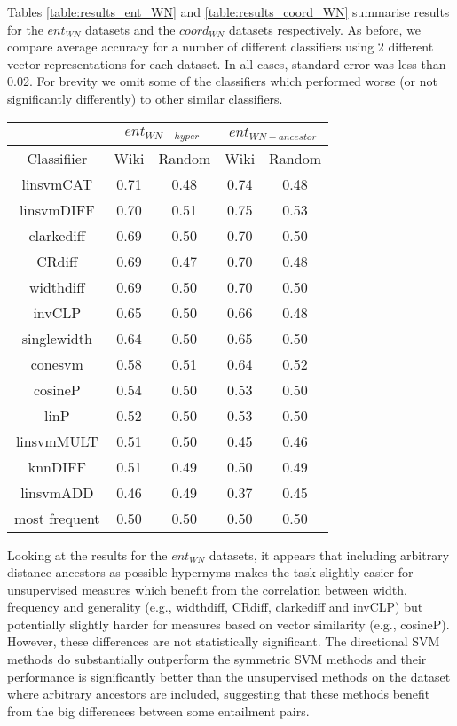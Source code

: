 \documentclass[11pt]{article}
\begin{document}
Tables \ref{table:results_ent_WN} and \ref{table:results_coord_WN} summarise results for the $ent_{WN}$ datasets and the $coord_{WN}$ datasets respectively.  As before, we compare average accuracy for a number of different classifiers using 2 different vector representations for each dataset.  In all cases, standard error was less than 0.02.  For brevity we omit some of the classifiers which performed worse (or not significantly differently) to other similar classifiers.


\begin{table*}[ht]
\centering
\begin{tabular}{|c|c|c|c|c|}
\hline
&\multicolumn{2}{|c|}{$ent_{WN-hyper}$}&\multicolumn{2}{|c|}{$ent_{WN-ancestor}$}\\
\hline
Classifiier&Wiki&Random&Wiki&Random\\
\hline
linsvmCAT&0.71&0.48&0.74&0.48\\
linsvmDIFF&0.70&0.51&0.75&0.53\\
clarkediff&0.69&0.50&0.70&0.50\\
CRdiff&0.69&0.47&0.70&0.48\\
widthdiff&0.69&0.50&0.70&0.50\\
invCLP&0.65&0.50&0.66&0.48\\
singlewidth&0.64&0.50&0.65&0.50\\
conesvm&0.58&0.51&0.64&0.52\\
cosineP&0.54&0.50&0.53&0.50\\
linP&0.52&0.50&0.53&0.50\\
linsvmMULT&0.51&0.50&0.45&0.46\\
knnDIFF&0.51&0.49&0.50&0.49\\
linsvmADD&0.46&0.49&0.37&0.45\\
most frequent&0.50&0.50&0.50&0.50\\
\hline
\end{tabular}
\caption{Accuracy Figures for $ent_{WN-hyper}$ and $ent_{WN-ancestor}$}
\label{table:results_ent_WN}
\end{table*}

Looking at the results for the $ent_{WN}$ datasets, it appears that including arbitrary distance ancestors as possible hypernyms makes the task slightly easier for unsupervised measures which benefit from the correlation between width, frequency and generality (e.g., widthdiff, CRdiff, clarkediff and invCLP) but potentially slightly harder for measures based on vector similarity (e.g., cosineP).  However, these differences are not statistically significant.  The directional SVM methods do substantially outperform the symmetric SVM methods and their performance is significantly better than the unsupervised methods on the dataset where arbitrary ancestors are included, suggesting that these methods benefit from the big differences between some entailment pairs.
\end{document}

